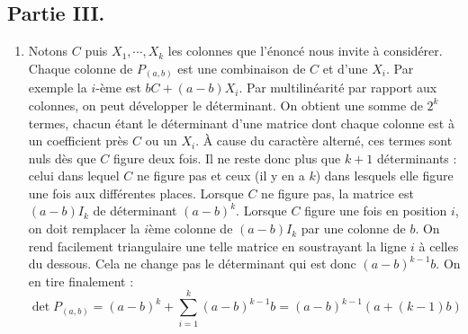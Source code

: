 \subsection*{Partie III.}
\begin{enumerate}
  \item Notons $C$ puis $X_1,\cdots,X_k$ les colonnes que l'énoncé nous invite à considérer. Chaque colonne de $P_{(a,b)}$ est une combinaison de $C$ et d'une $X_i$. Par exemple la $i$-ème est $bC+(a-b)X_i$. Par multilinéarité par rapport aux colonnes, on peut développer le déterminant. On obtient une somme de $2^k$ termes, chacun étant le déterminant d'une matrice dont chaque colonne est à un coefficient près $C$ ou un $X_i$. \`A cause du caractère alterné, ces termes sont nuls dès que $C$ figure deux fois. Il ne reste donc plus que $k+1$ déterminants : celui dans lequel $C$ ne figure pas et ceux (il y en a $k$) dans lesquels elle figure une fois aux différentes places.\newline
Lorsque $C$ ne figure pas, la matrice est $(a-b)I_k$ de déterminant $(a-b)^k$. Lorsque $C$ figure une fois en position $i$, on doit remplacer la $i$ème colonne de $(a-b)I_k$ par une colonne de $b$. On rend facilement triangulaire une telle matrice en soustrayant la ligne $i$ à celles du dessous. Cela ne change pas le déterminant qui est donc $(a-b)^{k-1}b$. On en tire finalement :
\begin{displaymath}
 \det P_{(a,b)} = (a-b)^k+\sum_{i=1}^k(a-b)^{k-1}b = (a-b)^{k-1}\left(a+(k-1)b \right) 
\end{displaymath}
 

\end{enumerate}
